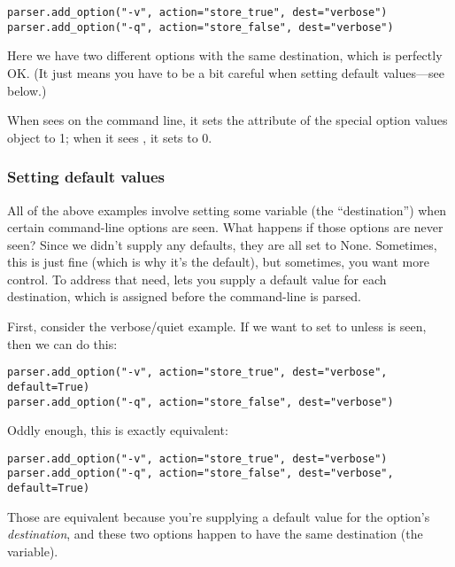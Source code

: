 \begin{verbatim}
parser.add_option("-v", action="store_true", dest="verbose")
parser.add_option("-q", action="store_false", dest="verbose")
\end{verbatim}

Here we have two different options with the same destination, which is
perfectly OK.  (It just means you have to be a bit careful when setting
default values---see below.)

When  sees  on the command line, it
sets the  attribute of the special {option values}
object to 1; when it sees , it sets  to
0.

\subsubsection{Setting default values\label{optparse-setting-default-values}}

All of the above examples involve setting some variable (the
``destination'') when certain command-line options are seen.  What
happens if those options are never seen?  Since we didn't supply any
defaults, they are all set to None.  Sometimes, this is just fine
(which is why it's the default), but sometimes, you want more control.
To address that need,  lets you supply a default
value for each destination, which is assigned before the command-line
is parsed.

First, consider the verbose/quiet example.  If we want
 to set  to  unless
 is seen, then we can do this:

\begin{verbatim}
parser.add_option("-v", action="store_true", dest="verbose", default=True)
parser.add_option("-q", action="store_false", dest="verbose")
\end{verbatim}

Oddly enough, this is exactly equivalent:

\begin{verbatim}
parser.add_option("-v", action="store_true", dest="verbose")
parser.add_option("-q", action="store_false", dest="verbose", default=True)
\end{verbatim}

Those are equivalent because you're supplying a default value for the
option's \emph{destination}, and these two options happen to have the same
destination (the  variable).

